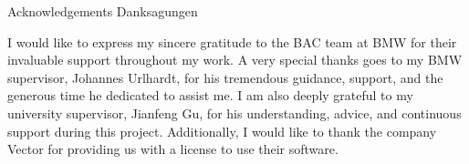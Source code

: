 \makeatletter
{}
{}
{}
\makeatother
\thispagestyle{empty}

\vspace*{20mm}

\begin{center}
\makeatletter
{}
{ Acknowledgements}
{ Danksagungen}
\makeatother
\end{center}

\vspace{10mm}

I would like to express my sincere gratitude to the BAC team at BMW for their invaluable support throughout my work. A very special thanks goes to my BMW supervisor, Johannes Urlhardt, for his tremendous guidance, support, and the generous time he dedicated to assist me. I am also deeply grateful to my university supervisor, Jianfeng Gu, for his understanding, advice, and continuous support during this project. Additionally, I would like to thank the company Vector for providing us with a license to use their software.

\cleardoublepage{}

